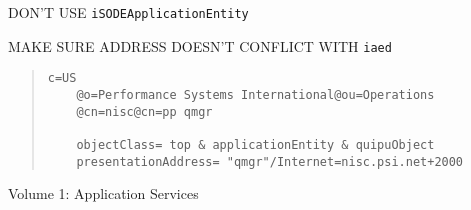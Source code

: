 \begin{bwslide}

\begin{nrtc}
\item	DON'T USE \verb"iSODEApplicationEntity"

\item	MAKE SURE ADDRESS DOESN'T CONFLICT WITH \verb"iaed"
\end{nrtc}
\begin{quote}\small\begin{verbatim}
c=US
    @o=Performance Systems International@ou=Operations
    @cn=nisc@cn=pp qmgr

    objectClass= top & applicationEntity & quipuObject
    presentationAddress= "qmgr"/Internet=nisc.psi.net+2000
\end{verbatim}\end{quote}
\end{bwslide}


\begin{bwslide}

\begin{nrtc}
\item	Volume 1: Application Services
\end{nrtc}
\end{bwslide}
